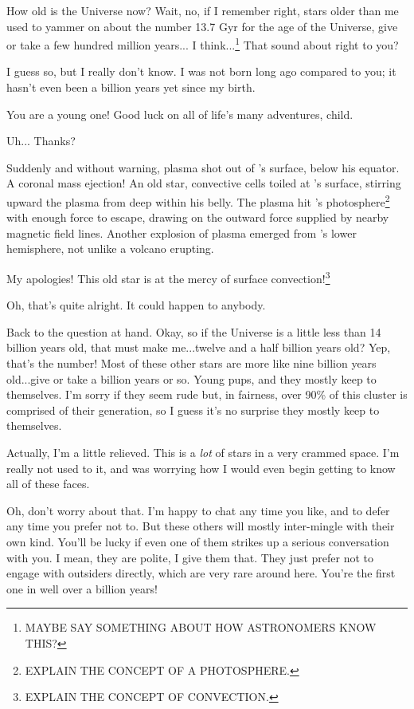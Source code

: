 \documentclass[main.tex]{subfiles}
\begin{document}
\newpara \Enrico How old is the Universe now?  Wait, no, if I remember right, stars older than me used to yammer on about the number 13.7 Gyr for the age of the Universe, give or take a few hundred million years... I think...\footnote{MAYBE SAY SOMETHING ABOUT HOW ASTRONOMERS KNOW THIS?}  That sound about right to you?

\newpara \Sterope I guess so, but I really don't know.  I was not born long ago compared to you; it hasn't even been a billion years yet since my birth.

\newpara \Enrico You are a young one!  Good luck on all of life's many adventures, child.  

\newpara \Sterope Uh... Thanks?

\newpara \nar Suddenly and without warning, plasma shot out of \rmenrico's surface, below his equator.  A coronal mass ejection!  An old star, convective cells toiled at \rmenrico's surface, stirring upward the plasma from deep within his belly.  The plasma hit \rmenrico's photosphere\footnote{EXPLAIN THE CONCEPT OF A PHOTOSPHERE.} with enough force to escape, drawing on the outward force supplied by nearby magnetic field lines.  Another explosion of plasma emerged from \rmenrico's lower hemisphere, not unlike a volcano erupting.

\newpara \Enrico My apologies!  This old star is at the mercy of surface convection!\footnote{EXPLAIN THE CONCEPT OF CONVECTION.}

\newpara \Sterope Oh, that's quite alright.  It could happen to anybody.

\newpara \Enrico Back to the question at hand.  Okay, so if the Universe is a little less than 14 billion years old, that must make me...twelve and a half billion years old?  Yep, that's the number!  Most of these other stars are more like nine billion years old...give or take a billion years or so.  Young pups, and they mostly keep to themselves.  I'm sorry if they seem rude but, in fairness, over 90\% of this cluster is comprised of their generation, so I guess it's no surprise they mostly keep to themselves.  

\newpara \Sterope Actually, I'm a little relieved.  This is a \textit{lot} of stars in a very crammed space.  I'm really not used to it, and was worrying how I would even begin getting to know all of these faces.

\newpara \Enrico Oh, don't worry about that.  I'm happy to chat any time you like, and to defer any time you prefer not to.  But these others will mostly inter-mingle with their own kind.  You'll be lucky if even one of them strikes up a serious conversation with you.  I mean, they are polite, I give them that.  They just prefer not to engage with outsiders directly, which are very rare around here.  You're the first one in well over a billion years!  
\end{document}
